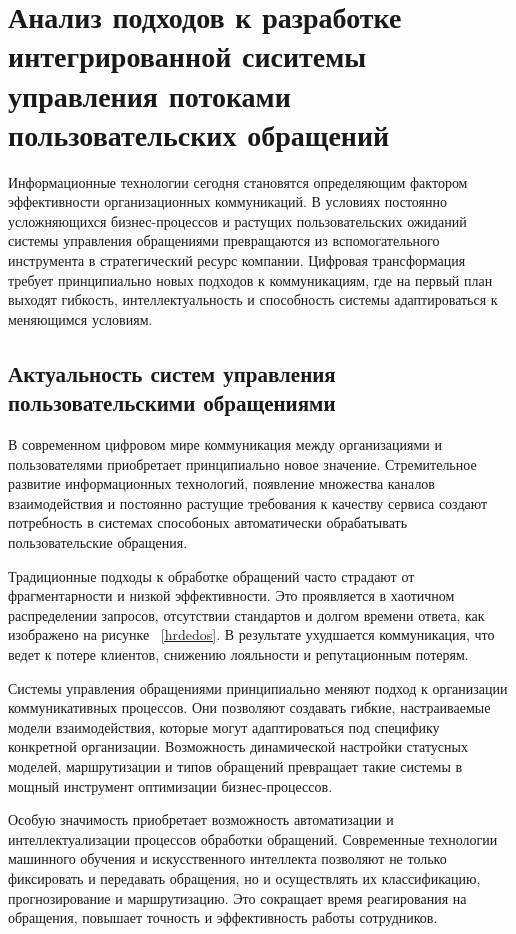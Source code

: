 \section{Анализ подходов к разработке интегрированной сиситемы управления потоками пользовательских обращений}
\label{sec:analysis}

Информационные технологии сегодня становятся определяющим фактором эффективности организационных коммуникаций. В условиях постоянно усложняющихся бизнес-процессов и растущих пользовательских ожиданий системы управления обращениями превращаются из вспомогательного инструмента в стратегический ресурс компании. Цифровая трансформация требует принципиально новых подходов к коммуникациям, где на первый план выходят гибкость, интеллектуальность и способность системы адаптироваться к меняющимся условиям.

\subsection{Актуальность систем управления пользовательскими обращениями}

В современном цифровом мире коммуникация между организациями и пользователями приобретает принципиально новое значение. Стремительное развитие информационных технологий, появление множества каналов взаимодействия и постоянно растущие требования к качеству сервиса создают потребность в системах способоных автоматически обрабатывать пользовательские обращения.

Традиционные подходы к обработке обращений часто страдают от фрагментарности и низкой эффективности. Это проявляется в хаотичном распределении запросов, отсутствии стандартов и долгом времени ответа, как изображено на рисунке ~\ref{hrdedos}. В результате ухудшается коммуникация, что ведет к потере клиентов, снижению лояльности и репутационным потерям.


Системы управления обращениями принципиально меняют подход к организации коммуникативных процессов. Они позволяют создавать гибкие, настраиваемые модели взаимодействия, которые могут адаптироваться под специфику конкретной организации. Возможность динамической настройки статусных моделей, маршрутизации и типов обращений превращает такие системы в мощный инструмент оптимизации бизнес-процессов.

Особую значимость приобретает возможность автоматизации и интеллектуализации процессов обработки обращений. Современные технологии машинного обучения и искусственного интеллекта позволяют не только фиксировать и передавать обращения, но и осуществлять их  классификацию, прогнозирование и маршрутизацию. Это сокращает время реагирования на обращения, повышает точность и эффективность работы сотрудников.

